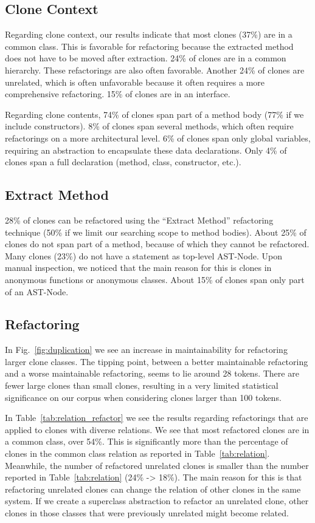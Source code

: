 \subsection{Clone Context}
Regarding clone context, our results indicate that most clones (37\%) are in a common class. This is favorable for refactoring because the extracted method does not have to be moved after extraction. 24\% of clones are in a common hierarchy. These refactorings are also often favorable. Another 24\% of clones are unrelated, which is often unfavorable because it often requires a more comprehensive refactoring. 15\% of clones are in an interface.

Regarding clone contents, 74\% of clones span part of a method body (77\% if we include constructors). 8\% of clones span several methods, which often require refactorings on a more architectural level. 6\% of clones span only global variables, requiring an abstraction to encapsulate these data declarations. Only 4\% of clones span a full declaration (method, class, constructor, etc.).

\subsection{Extract Method}
28\% of clones can be refactored using the ``Extract Method'' refactoring technique (50\% if we limit our searching scope to method bodies). About 25\% of clones do not span part of a method, because of which they cannot be refactored. Many clones (23\%) do not have a statement as top-level AST-Node. Upon manual inspection, we noticed that the main reason for this is clones in anonymous functions or anonymous classes. About 15\% of clones span only part of an AST-Node.

\subsection{Refactoring}
In Fig.~\ref{fig:duplication} we see an increase in maintainability for refactoring larger clone classes. The tipping point, between a better maintainable refactoring and a worse maintainable refactoring, seems to lie around 28 tokens. There are fewer large clones than small clones, resulting in a very limited statistical significance on our corpus when considering clones larger than 100 tokens.

In Table~\ref{tab:relation_refactor} we see the results regarding refactorings that are applied to clones with diverse relations. We see that most refactored clones are in a common class, over 54\%. This is significantly more than the percentage of clones in the common class relation as reported in Table~\ref{tab:relation}. Meanwhile, the number of refactored unrelated clones is smaller than the number reported in Table~\ref{tab:relation} (24\% -> 18\%). The main reason for this is that refactoring unrelated clones can change the relation of other clones in the same system. If we create a superclass abstraction to refactor an unrelated clone, other clones in those classes that were previously unrelated might become related.

